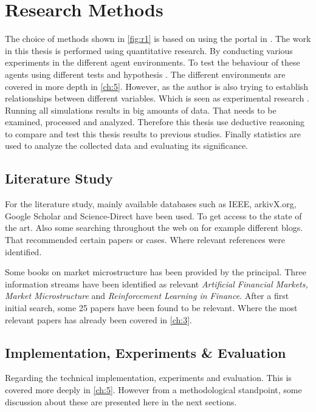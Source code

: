 \documentclass{kththesis}
\theoremstyle{definition}
\begin{document}
\section{Research Methods}
The choice of methods shown in \autoref{fig:r1} is based on using the portal in \parencite{haakansson2013portal}. The work in this thesis is performed using quantitative research. By conducting various experiments in the different agent environments. To test the behaviour of these agents using different tests and hypothesis \parencite{haakansson2013portal}. The different environments are covered in more depth in \autoref{ch:5}. However, as the author is also trying to establish relationships between different variables. Which is seen as experimental research \parencite{haakansson2013portal}.  Running all simulations results in big amounts of data. That needs to be examined, processed and analyzed. Therefore this thesis use deductive reasoning to compare and test this thesis results to previous studies. Finally statistics are used to analyze the collected data and evaluating its significance.

\subsection{Literature Study}
For the literature study, mainly available databases such as IEEE, arkivX.org, Google Scholar and Science-Direct have been used. To get access to the state of the art. Also some searching throughout the web on for example different blogs. That recommended certain papers or cases. Where relevant references were identified.

\newpage
Some books on market microstructure has been provided by the principal. Three information streams have been identified as relevant \textit{Artificial Financial Markets, Market Microstructure} and \textit{Reinforcement Learning in Finance}. After a first initial search, some 25 papers have been found to be relevant. Where the most relevant papers has already been covered in \autoref{ch:3}.

\subsection{Implementation, Experiments \& Evaluation}
Regarding the technical implementation, experiments and evaluation. This is covered more deeply in \autoref{ch:5}. However from a methodological standpoint, some discussion about these are presented here in the next sections.
\end{document}
